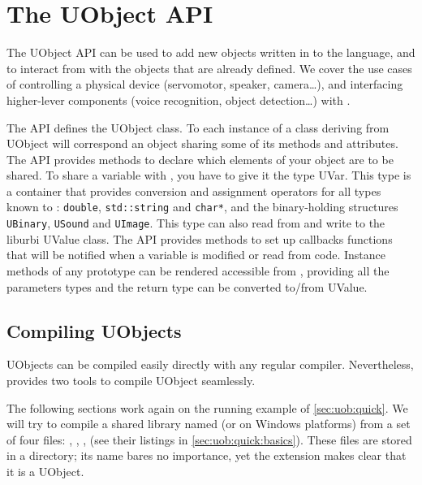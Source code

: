 
\chapter{The UObject API}
\label{sec:uob:api}

The UObject API can be used to add new objects written in \Cxx to the
\us language, and to interact from \Cxx with the objects that are
already defined. We cover the use cases of controlling a physical
device (servomotor, speaker, camera\ldots), and interfacing
higher-lever components (voice recognition, object detection\ldots)
with \urbi.

The \Cxx API defines the UObject class. To each instance of a \Cxx class
deriving from UObject will correspond an \us object sharing some of its
methods and attributes. The API provides methods to declare which elements
of your object are to be shared. To share a variable with \urbi, you have to
give it the type UVar. This type is a container that provides conversion and
assignment operators for all types known to \urbi: \lstinline{double},
\lstinline{std::string} and \lstinline{char*}, and the binary-holding
structures \lstinline{UBinary}, \lstinline{USound} and
\lstinline{UImage}. This type can also read from and write to the liburbi
UValue class. The API provides methods to set up callbacks functions that
will be notified when a variable is modified or read from \urbi
code. Instance methods of any prototype can be rendered accessible from \us,
providing all the parameters types and the return type can be converted
to/from UValue.

\section{Compiling UObjects}

UObjects can be compiled easily directly with any regular compiler.
Nevertheless, \usdk provides two tools to compile UObject seamlessly.

The following sections work again on the running example of
\autoref{sec:uob:quick}.  We will try to compile a shared library named
 (or  on Windows platforms) from a set of
four files: , , ,
 (see their listings in \autoref{sec:uob:quick:basics}).
These files are stored in a  directory; its name bares no
importance, yet the  extension makes clear that it is a UObject.

